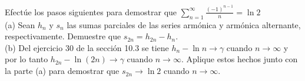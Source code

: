 \item Efectúe los pasos siguientes para demostrar que $\sum_{n=1}^{\infty} \frac{(-1)^{n-1}}{n} = \ln 2$ \\
    (a) Sean $h_n$ y $s_n$ las sumas parciales de las series armónica y armónica alternante, respectivamente. Demuestre que $s_{2n} = h_{2n} - h_n$. \\
    (b) Del ejercicio 30 de la sección 10.3 se tiene $h_n - \ln n \to \gamma$ cuando $n \to \infty$ y por lo tanto $h_{2n} - \ln(2n) \to \gamma$ cuando $n \to \infty$. Aplique estos hechos junto con la parte (a) para demostrar que $s_{2n} \to \ln 2$ cuando $n \to \infty$.
